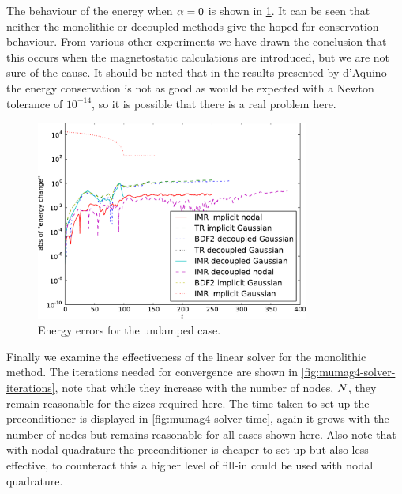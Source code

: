 The behaviour of the energy when $\alpha = 0$ is shown in \cref{fig:energy-conservation}.
It can be seen that neither the monolithic or decoupled methods give the hoped-for conservation behaviour.
From various other experiments we have drawn the conclusion that this occurs when the magnetostatic calculations are introduced, but we are not sure of the cause.
It should be noted that in the results presented by d'Aquino \cite{DAquino2005} the energy conservation is not as good as would be expected with a Newton tolerance of $10^{-14}$, so it is possible that there is a real problem here.

\begin{figure}
  \centering
  \includegraphics[width=0.8\textwidth]{plots/sq_mumag4_energy_conservation/absofenergychangevstimes.pdf}
  \caption{Energy errors for the undamped case.}
  \label{fig:energy-conservation}
\end{figure}



Finally we examine the effectiveness of the linear solver for the monolithic method.
The iterations needed for convergence are shown in \cref{fig:mumag4-solver-iterations}, note that while they increase with the number of nodes, $N$, they remain reasonable for the sizes required here.
The time taken to set up the preconditioner is displayed in \cref{fig:mumag4-solver-time}, again it grows with the number of nodes but remains reasonable for all cases shown here.
Also note that with nodal quadrature the preconditioner is cheaper to set up but also less effective, to counteract this a higher level of fill-in could be used with nodal quadrature.

